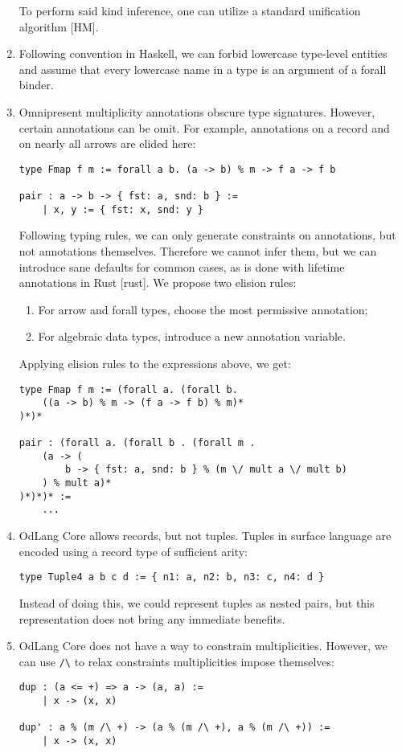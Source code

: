 \documentclass[a4paper,14pt]{extreport}
\begin{document}
\begin{enumerate}
        To perform said kind inference, one can utilize a standard unification
        algorithm [HM].
    \item Following convention in Haskell, we can forbid lowercase type-level
        entities and assume that every lowercase name in a type is an argument
        of a forall binder.
    \item Omnipresent multiplicity annotations obscure type signatures.
        However, certain annotations can be omit. For example, annotations on a
        record and on nearly all arrows are elided here:
\begin{verbatim}
type Fmap f m := forall a b. (a -> b) % m -> f a -> f b

pair : a -> b -> { fst: a, snd: b } :=
    | x, y := { fst: x, snd: y }
\end{verbatim}
        Following typing rules, we can only generate constraints on annotations,
        but not annotations themselves. Therefore we cannot infer them, but we
        can introduce sane defaults for common cases, as is done with lifetime
        annotations in Rust [rust]. We propose two elision rules:
        \begin{enumerate}
            \item For arrow and forall types, choose the most permissive
                annotation;
            \item For algebraic data types, introduce a new annotation variable.
        \end{enumerate}
        Applying elision rules to the expressions above, we get:
\begin{verbatim}
type Fmap f m := (forall a. (forall b.
    ((a -> b) % m -> (f a -> f b) % m)*
)*)*

pair : (forall a. (forall b . (forall m .
    (a -> (
        b -> { fst: a, snd: b } % (m \/ mult a \/ mult b)
    ) % mult a)*
)*)*)* :=
    ...
\end{verbatim}
    \item OdLang Core allows records, but not tuples. Tuples in surface language
        are encoded using a record type of sufficient arity:
\begin{verbatim}
type Tuple4 a b c d := { n1: a, n2: b, n3: c, n4: d }
\end{verbatim}
        Instead of doing this, we could represent tuples as nested pairs, but
        this representation does not bring any immediate benefits.
    \item OdLang Core does not have a way to constrain multiplicities. However,
        we can use \verb|/\| to relax constraints multiplicities impose
        themselves:
\begin{verbatim}
dup : (a <= +) => a -> (a, a) :=
    | x -> (x, x)

dup' : a % (m /\ +) -> (a % (m /\ +), a % (m /\ +)) :=
    | x -> (x, x)
\end{verbatim}
\end{enumerate}
\end{document}

